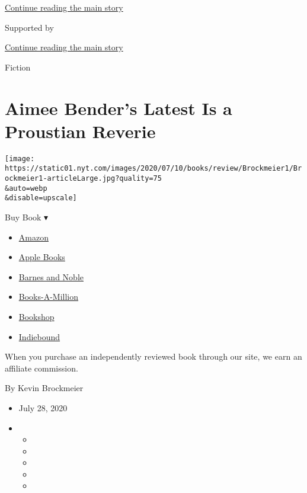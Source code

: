 \protect\hyperlink{after-top}{Continue reading the main story}

Supported by

\protect\hyperlink{after-sponsor}{Continue reading the main story}

Fiction

\hypertarget{aimee-benders-latest-is-a-proustian-reverie}{%
\section{Aimee Bender's Latest Is a Proustian
Reverie}\label{aimee-benders-latest-is-a-proustian-reverie}}

\texttt{[image: https://static01.nyt.com/images/2020/07/10/books/review/Brockmeier1/Brockmeier1-articleLarge.jpg?quality=75\\\&auto=webp\\\&disable=upscale]}

Buy Book ▾

\begin{itemize}
\tightlist
\item
  \href{https://www.amazon.com/gp/search?index=books\&tag=NYTBSREV-20\&field-keywords=The+Butterfly+Lampshade+Aimee+Bender}{Amazon}
\item
  \href{https://du-gae-books-dot-nyt-du-prd.appspot.com/buy?title=The+Butterfly+Lampshade\&author=Aimee+Bender}{Apple
  Books}
\item
  \href{https://www.anrdoezrs.net/click-7990613-11819508?url=https\%3A\%2F\%2Fwww.barnesandnoble.com\%2Fw\%2F\%3Fean\%3D9780385534871}{Barnes
  and Noble}
\item
  \href{https://www.anrdoezrs.net/click-7990613-35140?url=https\%3A\%2F\%2Fwww.booksamillion.com\%2Fp\%2FThe\%2BButterfly\%2BLampshade\%2FAimee\%2BBender\%2F9780385534871}{Books-A-Million}
\item
  \href{https://bookshop.org/a/3546/9780385534871}{Bookshop}
\item
  \href{https://www.indiebound.org/book/9780385534871?aff=NYT}{Indiebound}
\end{itemize}

When you purchase an independently reviewed book through our site, we
earn an affiliate commission.

By Kevin Brockmeier

\begin{itemize}
\item
  July 28, 2020
\item
  \begin{itemize}
  \item
  \item
  \item
  \item
  \item
  \end{itemize}
\end{itemize}

